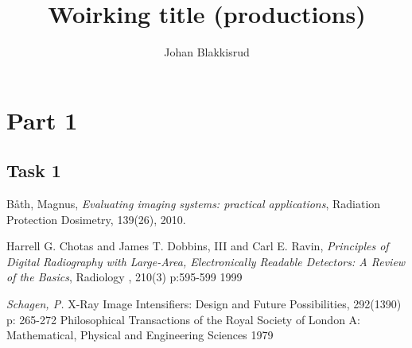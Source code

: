\documentclass[12p]{article}
\title{Woirking title (productions)}
\author{Johan Blakkisrud}
\begin{document}
\maketitle

\section*{Part 1}
\subsection*{Task 1}

\begin{thebibliography}{9}

Båth, Magnus,
\emph{Evaluating imaging systems: practical applications},
Radiation Protection Dosimetry,
139(26),
2010.

Harrell G. Chotas and James T. Dobbins, III and Carl E. Ravin,
\emph{Principles of Digital Radiography with Large-Area, Electronically Readable Detectors: A Review of the Basics},
Radiology ,
210(3) p:595-599
1999

\emph{Schagen, P.}
X-Ray Image Intensifiers: Design and Future Possibilities,
292(1390) p: 265-272
Philosophical Transactions of the Royal Society of London A: Mathematical, Physical and Engineering Sciences
1979


\end{thebibliography}
 
\end{document}
